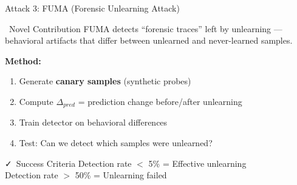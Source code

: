\documentclass[aspectratio=169, 11pt]{beamer}
\begin{document}
\begin{frame}{Attack 3: FUMA (Forensic Unlearning Attack)}
    \begin{block}{\faFingerprint\ Novel Contribution}
        FUMA detects ``forensic traces'' left by unlearning --- behavioral artifacts that differ between unlearned and never-learned samples.
    \end{block}
    
    \vspace{0.5em}
    \textbf{Method:}
    \begin{enumerate}
        \item Generate \textbf{canary samples} (synthetic probes)
        \item Compute $\Delta_{pred}$ = prediction change before/after unlearning
        \item Train detector on behavioral differences
        \item Test: Can we detect which samples were unlearned?
    \end{enumerate}
    
    \vspace{0.5em}
    \begin{exampleblock}{\faCheck\ Success Criteria}
        Detection rate $<$ 5\% = Effective unlearning\\
        Detection rate $>$ 50\% = Unlearning failed
    \end{exampleblock}
\end{frame}
\end{document}
